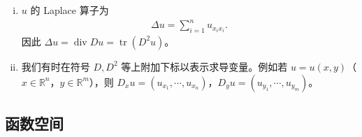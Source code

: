 \documentclass[../main.tex]{subfiles}
\begin{document}
\begin{enumerate}[(i)]
\item $u$ 的 Laplace 算子为
\begin{align*}
\Delta u=\sum_{i=1}^n u_{x_ix_i}.
\end{align*}
因此 $\Delta u=\operatorname{div}Du=\operatorname{tr}(D^2u)$。

\item 我们有时在符号 $D,D^2$ 等上附加下标以表示求导变量。例如若 $u=u(x,y)$（$x\in\mathbb{R}^n$，$y\in\mathbb{R}^m$），则 $D_xu=(u_{x_1},\cdots,u_{x_n})$，$D_yu=(u_{y_1},\cdots,u_{y_m})$。
\end{enumerate}

\subsection{函数空间}\label{subsection:appA-函数空间}
\end{document}
